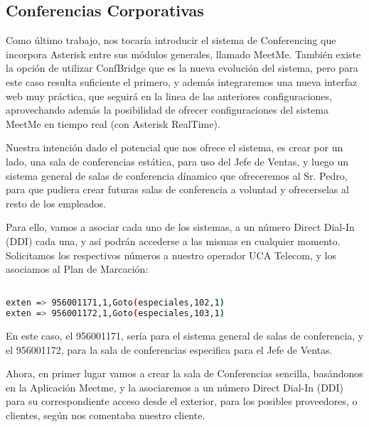 {


\subsection{Conferencias Corporativas}

Como último trabajo, nos tocaría introducir el sistema de Conferencing que incorpora Asterisk entre sus módulos generales, llamado MeetMe. También existe la opción de utilizar ConfBridge que es la nueva evolución del sistema, pero para este caso resulta suficiente el primero, y además integraremos una nueva interfaz web muy práctica, que seguirá en la linea de las anteriores configuraciones, aprovechando además la posibilidad de ofrecer configuraciones del sistema MeetMe en tiempo real (con Asterisk RealTime).

Nuestra intención dado el potencial que nos ofrece el sistema, es crear por un lado, una sala de conferencias estática, para uso del Jefe de Ventas, y luego un sistema general de salas de conferencia dínamico que ofreceremos al Sr. Pedro, para que pudiera crear futuras salas de conferencia a voluntad y ofrecerselas al resto de los empleados.

Para ello, vamos a asociar cada uno de los sistemas, a un número Direct Dial-In (DDI) cada una, y así podrán accederse a las mismas en cualquier momento. Solicitamos los respectivos números a nuestro operador UCA Telecom, y los asociamos al Plan de Marcación:

\begin{lstlisting}[language=bash,title={/etc/asterisk/extensions.conf}]

exten => 956001171,1,Goto(especiales,102,1)
exten => 956001172,1,Goto(especiales,103,1)

\end{lstlisting}

En este caso, el 956001171, sería para el sistema general de salas de conferencia, y el 956001172, para la sala de conferencias especifica para el Jefe de Ventas.

Ahora, en primer lugar vamos a crear la sala de Conferencias sencilla, basándonos en la Aplicación Meetme, y la asociaremos a un número Direct Dial-In (DDI) para su correspondiente acceso desde el exterior, para los posibles proveedores, o clientes, según nos comentaba nuestro cliente.

}
